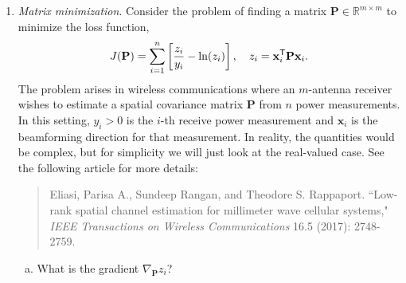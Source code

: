 \documentclass[11pt]{article}
\def\R{{\mathbb{R}}}
\def\x{\times}
\newcommand{\wbf}{\mathbf{w}}
\newcommand{\xbf}{\mathbf{x}}
\newcommand{\Pbf}{\mathbf{P}}
\newcommand{\tran}{^{\text{\sf T}}}
\begin{document}
\begin{enumerate}
\begin{enumerate}[(a)]
For $\rho_2 = 1 - \alpha b_2$: we need $-1 < 1 - \alpha b_2 < 1$, which gives $0 < \alpha < \frac{2}{b_2}$.

Since $b_2 > b_1$, the more restrictive condition is $\alpha < \frac{2}{b_2}$.

Therefore, gradient descent converges when $0 < \alpha < \frac{2}{b_2}$.

\item With $\alpha = \frac{2}{b_1 + b_2}$:

$$\rho_1 = 1 - \frac{2b_1}{b_1 + b_2} = \frac{b_1 + b_2 - 2b_1}{b_1 + b_2} = \frac{b_2 - b_1}{b_1 + b_2}$$

$$\rho_2 = 1 - \frac{2b_2}{b_1 + b_2} = \frac{b_1 + b_2 - 2b_2}{b_1 + b_2} = \frac{b_1 - b_2}{b_1 + b_2} = -\frac{b_2 - b_1}{b_1 + b_2}$$

Since $b_2 > b_1$, we have $\rho_1 = \frac{b_2 - b_1}{b_1 + b_2}$ and $\rho_2 = -\frac{b_2 - b_1}{b_1 + b_2}$.

The convergence rate is determined by the larger of $|\rho_1|$ and $|\rho_2|$, which is:
$$C = \frac{b_2 - b_1}{b_1 + b_2} = \frac{b_2/b_1 - 1}{b_2/b_1 + 1} = \frac{\kappa - 1}{\kappa + 1}$$

where $\kappa = \frac{b_2}{b_1}$ is the condition number.

The norm decreases as:
$$\|\wbf^k\| = C^k \|\wbf^0\|$$

When $\kappa$ is very large (ill-conditioned), $C \approx 1$ and convergence is slow.
\end{enumerate}

\item \emph{Matrix minimization}.  Consider the problem of finding a matrix
$\Pbf \in \R^{m \x m}$ to minimize the loss function,
\[
    J(\Pbf) = \sum_{i=1}^n \left[ \frac{z_i}{y_i} - \ln(z_i) \right],
    \quad
    z_i = \xbf_i\tran \Pbf \xbf_i.
\]
The problem arises in wireless communications where an $m$-antenna receiver wishes
to estimate a spatial covariance matrix $\Pbf$ from $n$ power measurements.
In this setting, $y_i > 0$ is the $i$-th receive power measurement and $\xbf_i$
is the beamforming direction for that measurement.  In reality, the quantities
would be complex, but for simplicity we will just look at the real-valued case.
See the following article for more details:
\begin{quote}
  Eliasi, Parisa A., Sundeep Rangan, and Theodore S. Rappaport. ``Low-rank spatial channel estimation for millimeter wave cellular systems," \emph{IEEE Transactions on Wireless Communications} 16.5 (2017): 2748-2759.
\end{quote}
\begin{enumerate}[(a)]
\item What is the gradient $\nabla_{\Pbf} z_i$?


\end{enumerate}
\end{enumerate}
\end{document}
